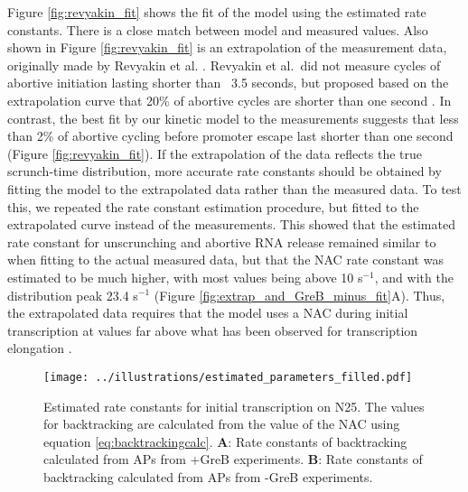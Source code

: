 Figure \ref{fig:revyakin_fit} shows the fit of the model using the estimated
rate constants. There is a close match between model and measured values. Also
shown in Figure \ref{fig:revyakin_fit} is an extrapolation of the measurement
data, originally made by Revyakin et al. \cite{revyakin_abortive_2006}.
Revyakin et al.\ did not measure cycles of abortive initiation lasting shorter
than ~3.5 seconds, but proposed based on the extrapolation curve that 20\% of
abortive cycles are shorter than one second \cite{revyakin_abortive_2006}.  In
contrast, the best fit by our kinetic model to the measurements suggests that
less than 2\% of abortive cycling before promoter escape last shorter than one
second (Figure \ref{fig:revyakin_fit}). If the extrapolation of the data
reflects the true scrunch-time distribution, more accurate rate constants
should be obtained by fitting the model to the extrapolated data rather than
the measured data. To test this, we repeated the rate constant estimation
procedure, but fitted to the extrapolated curve instead of the measurements.
This showed that the estimated rate constant for unscrunching and abortive RNA
release remained similar to when fitting to the actual measured data, but that
the NAC rate constant was estimated to be much higher, with most values being
above 10 s$^{-1}$, and with the distribution peak 23.4 s$^{-1}$ (Figure
\ref{fig:extrap_and_GreB_minus_fit}A). Thus, the extrapolated data requires
that the model uses a NAC during initial transcription at values far above
what has been observed for transcription elongation
\cite{revyakin_abortive_2006}.

\begin{figure}
	\begin{center}
      \texttt{[image: ../illustrations/estimated\_parameters\_filled.pdf]}
	\end{center}
    \caption{Estimated rate constants for initial transcription on N25. The
        values for backtracking are calculated from the value of the NAC using
        equation \eqref{eq:backtrackingcalc}. \textbf{A}: Rate constants of
        backtracking calculated from APs from +GreB experiments. \textbf{B}:
        Rate constants of backtracking calculated from APs from -GreB
        experiments.}
    \label{fig:estimated_parameters}
\end{figure}

